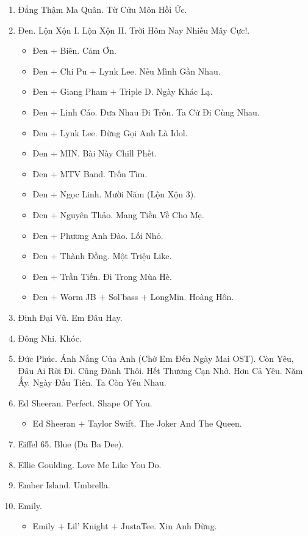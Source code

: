 \documentclass{article}
\begin{document}
\begin{enumerate}
	\item {\sc Đẳng Thậm Ma Quân.} Từ Cửu Môn Hồi Ức.
	\item {\sc Đen.} Lộn Xộn I. Lộn Xộn II. Trời Hôm Nay Nhiều Mây Cực!.
	\begin{itemize}
		\item {\sc Đen $+$ Biên.} Cảm Ơn.
		\item {\sc Đen $+$ Chi Pu $+$ Lynk Lee.} Nếu Mình Gần Nhau.
		\item {\sc Đen $+$ Giang Pham $+$ Triple D.} Ngày Khác Lạ.
		\item {\sc Đen $+$ Linh Cáo.} Đưa Nhau Đi Trốn. Ta Cứ Đi Cùng Nhau.
		\item {\sc Đen $+$ Lynk Lee.} Đừng Gọi Anh Là Idol.
		\item {\sc Đen $+$ MIN.} Bài Này Chill Phết.
		\item {\sc Đen $+$ MTV Band.} Trốn Tìm.
		\item {\sc Đen $+$ Ngọc Linh.} Mười Năm (Lộn Xộn 3).
		\item {\sc Đen $+$ Nguyên Thảo.} Mang Tiền Về Cho Mẹ.
		\item {\sc Đen $+$ Phương Anh Đào.} Lối Nhỏ.
		\item {\sc Đen $+$ Thành Đồng.} Một Triệu Like.
		\item {\sc Đen $+$ Trần Tiến.} Đi Trong Mùa Hè.
		\item {\sc Đen $+$ Worm JB $+$ Sol'bass $+$ LongMin.} Hoàng Hôn.
	\end{itemize}
	\item {\sc Đinh Đại Vũ.} Em Đâu Hay.
	\item {\sc Đông Nhi.} Khóc.
	\item {\sc Đức Phúc.} Ánh Nắng Của Anh (Chờ Em Đến Ngày Mai OST). Còn Yêu, Đâu Ai Rời Đi. Cũng Đành Thôi. Hết Thương Cạn Nhớ. Hơn Cả Yêu. Năm Ấy. Ngày Đầu Tiên. Ta Còn Yêu Nhau.
	\item {\sc Ed Sheeran.} Perfect. Shape Of You.
	\begin{itemize}
		\item {\sc Ed Sheeran $+$ Taylor Swift.} The Joker And The Queen.
	\end{itemize}
	\item {\sc Eiffel 65.} Blue (Da Ba Dee).
	\item {\sc Ellie Goulding.} Love Me Like You Do.
	\item {\sc Ember Island.} Umbrella.
	\item {\sc Emily.}
	\begin{itemize}
		\item {\sc Emily $+$ Lil' Knight $+$ JustaTee.} Xin Anh Đừng.

\end{itemize}
\end{enumerate}
\end{document}
